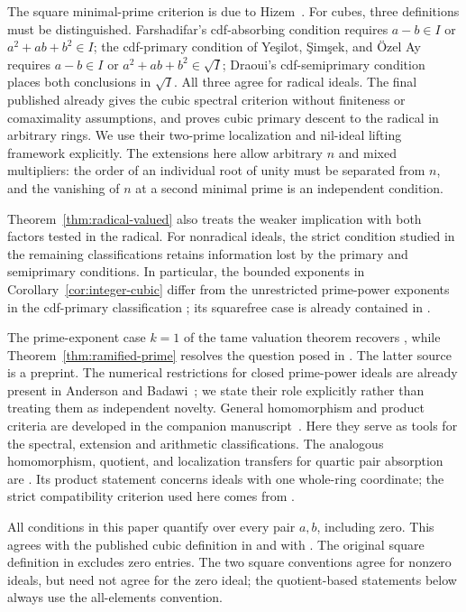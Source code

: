 \documentclass[11pt,a4paper]{amsart}
\theoremstyle{definition}
\theoremstyle{remark}
\numberwithin{equation}{section}
\begin{document}
The square minimal-prime criterion is due to Hizem~\cite{Hizem}.
For cubes, three definitions must be distinguished. Farshadifar's
cdf-absorbing condition requires $a-b\in I$ or
$a^2+ab+b^2\in I$; the cdf-primary condition of
Ye\c{s}ilot, \c{S}im\c{s}ek, and \"Ozel Ay~\cite{YSO} requires
$a-b\in I$ or $a^2+ab+b^2\in\sqrt I$; Draoui's
cdf-semiprimary condition~\cite[Definition~2.1]{Dr26} places both
conclusions in $\sqrt I$. All three agree for radical ideals.
The final published \cite[Theorem~1]{YSO} already gives the cubic
spectral criterion without finiteness or comaximality assumptions,
and \cite[Theorem~2]{YSO} proves cubic primary descent to the
radical in arbitrary rings. We use their two-prime localization and
nil-ideal lifting framework explicitly. The extensions here allow
arbitrary $n$ and mixed multipliers: the order of an individual root
of unity must be separated from $n$, and the vanishing of $n$ at a
second minimal prime is an independent condition.

Theorem~\ref{thm:radical-valued} also treats the weaker implication
with both factors tested in the radical. For nonradical ideals, the
strict condition studied in the remaining classifications retains
information lost by the primary and semiprimary conditions. In
particular, the bounded exponents in
Corollary~\ref{cor:integer-cubic} differ from the unrestricted
prime-power exponents in the cdf-primary classification
\cite[Theorem~6]{YSO}; its squarefree case is already contained in
\cite[Theorem~5]{YSO}.

The prime-exponent case $k=1$ of the tame valuation theorem recovers
\cite[Theorem~3]{Yes}, while Theorem~\ref{thm:ramified-prime} resolves
the question posed in \cite[Remark~5]{Yes}. The latter source is a
preprint. The numerical restrictions for closed prime-power ideals
are already present in Anderson and Badawi~\cite{ABclosed}; we state
their role explicitly rather than treating them as independent
novelty. General homomorphism and product criteria are developed in
the companion manuscript~\cite{TS}. Here they serve as tools for
the spectral, extension and arithmetic classifications. The analogous
homomorphism, quotient, and localization transfers for quartic pair
absorption are \cite[Proposition~3.2, Corollary~3.3, and
Proposition~3.6]{TAHA}. Its product statement
\cite[Proposition~3.1]{TAHA} concerns ideals with one whole-ring
coordinate; the strict compatibility criterion used here comes from
\cite{TS}.

All conditions in this paper quantify over every pair $a,b$, including
zero. This agrees with the published cubic definition in
\cite[Definition~2.1]{Far} and
with \cite{Yes,TS}. The original square definition in \cite{ABC} excludes
zero entries. The two square conventions agree for nonzero ideals, but
need not agree for the zero ideal; the quotient-based statements below
always use the all-elements convention.
\end{document}
